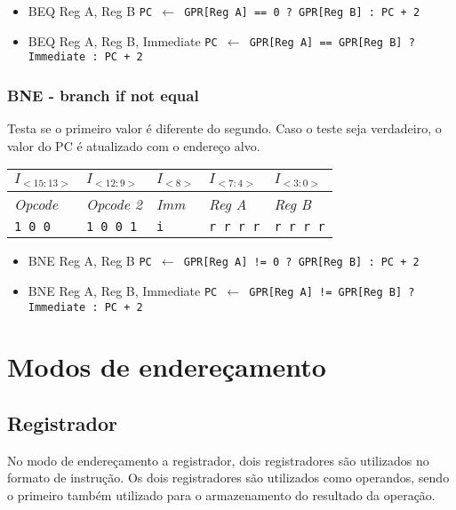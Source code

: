 \documentclass[11pt,a4paper]{report}
\begin{document}
\begin{itemize}
\item BEQ Reg A, Reg B
\subitem \texttt{PC $\leftarrow$ GPR[Reg A] == 0 ? GPR[Reg B] : PC + 2}
\item BEQ Reg A, Reg B, Immediate
\subitem \texttt{PC $\leftarrow$ GPR[Reg A] == GPR[Reg B] ? Immediate :  PC + 2}
\end{itemize}

\subsubsection{BNE - branch if not equal}
Testa se o primeiro valor é diferente do segundo. Caso o teste
seja verdadeiro, o valor do PC é atualizado com o endereço alvo.

\begin{table}[htb!]
\centering
\begin{tabular}{|p{2cm}|p{2cm}|p{2cm}|p{2cm}|p{2cm}|}
\hline
$I_{<15:13>}$ & $I_{<12:9>}$ & $I_{<8>}$ & $I_{<7:4>}$ & $I_{<3:0>}$  \\ \hline
\textit{Opcode} & \textit{Opcode 2} & \textit{Imm} & \textit{Reg A} & \textit{Reg B} \\ \hline
\texttt{1 0 0} & \texttt{1 0 0 1} & \texttt{i} & \texttt{r r r r} & \texttt{r r r r} \\ \hline
\end{tabular}
\end{table}

\begin{itemize}
\item BNE Reg A, Reg B
\subitem \texttt{PC $\leftarrow$ GPR[Reg A] != 0 ? GPR[Reg B] : PC + 2}
\item BNE Reg A, Reg B, Immediate
\subitem \texttt{PC $\leftarrow$ GPR[Reg A] != GPR[Reg B] ? Immediate :  PC + 2}
\end{itemize}


\section{Modos de endereçamento}

\subsection{Registrador}

No modo de endereçamento a registrador, dois registradores são utilizados
no formato de instrução. Os dois registradores são utilizados como
operandos, sendo o primeiro também utilizado para o armazenamento do
resultado da operação.
\end{document}

